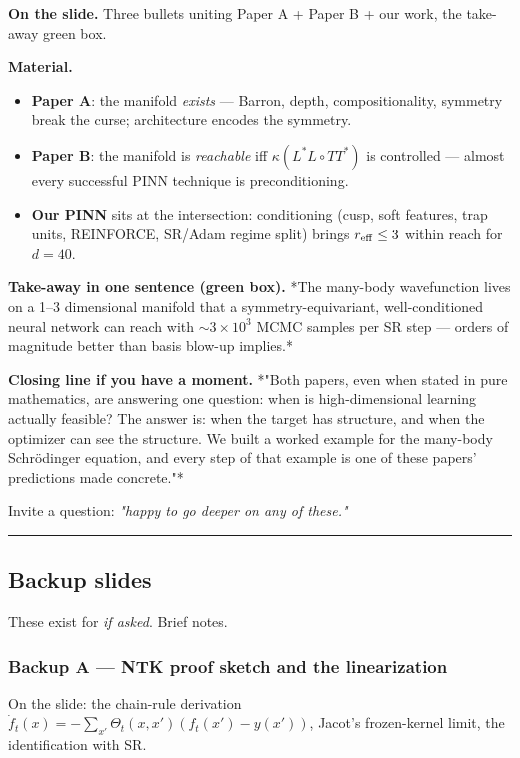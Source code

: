 \documentclass[11pt]{article}
\begin{document}
\textbf{On the slide.} Three bullets uniting Paper A + Paper B + our work,
the take-away green box.

\textbf{Material.}

\begin{itemize}
\item \textbf{Paper A}: the manifold \emph{exists} --- Barron, depth, compositionality,
symmetry break the curse; architecture encodes the symmetry.
\item \textbf{Paper B}: the manifold is \emph{reachable} iff $\kappa(L^* L \circ TT^*)$
is controlled --- almost every successful PINN technique is
preconditioning.
\item \textbf{Our PINN} sits at the intersection: conditioning (cusp, soft
features, trap units, REINFORCE, SR/Adam regime split) brings $r_{\rm
  eff} \le 3$ within reach for $d = 40$.
\end{itemize}
\textbf{Take-away in one sentence (green box).} *The many-body wavefunction
lives on a 1--3 dimensional manifold that a symmetry-equivariant,
well-conditioned neural network can reach with $\sim 3 \times 10^3$ MCMC
samples per SR step --- orders of magnitude better than basis blow-up
implies.*

\textbf{Closing line if you have a moment.} *"Both papers, even when stated in
pure mathematics, are answering one question: when is high-dimensional
learning actually feasible? The answer is: when the target has structure,
and when the optimizer can see the structure. We built a worked example
for the many-body Schr\"odinger equation, and every step of that example is
one of these papers' predictions made concrete."*

Invite a question: \emph{"happy to go deeper on any of these."}

\vspace{4pt}\hrule\vspace{8pt}

\subsection*{Backup slides}

These exist for \emph{if asked}. Brief notes.

\subsubsection*{Backup A --- NTK proof sketch and the linearization}

On the slide: the chain-rule derivation $\dot f_t(x) = -\sum_{x'}
\Theta_t(x, x') (f_t(x') - y(x'))$, Jacot's frozen-kernel limit, the
identification with SR.
\end{document}
